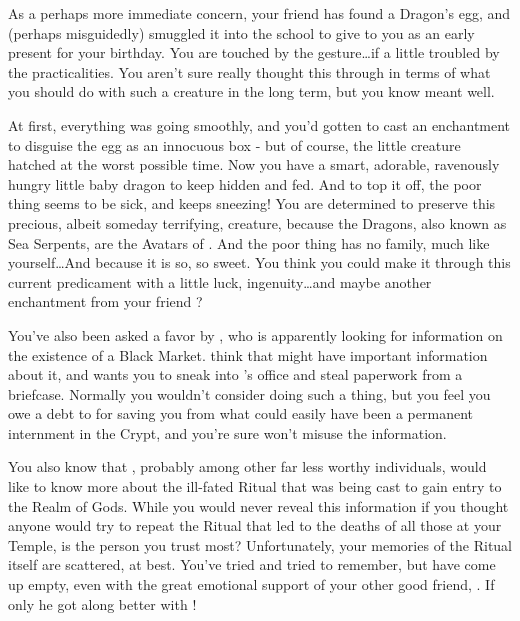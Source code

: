 \documentclass[char]{GL2020}
\begin{document}
As a perhaps more immediate concern, your friend \cPirateChild{} has found a Dragon’s egg, and (perhaps misguidedly) smuggled it into the school to give to you as an early present for your birthday. You are touched by the gesture\ldots if a little troubled by the practicalities. You aren’t sure \cPirateChild{} really thought this through in terms of what you should do with such a creature in the long term, but you know \cPirateChild{\they} meant well. 

At first, everything was going smoothly, and you’d gotten \cAdopted{} to cast an enchantment to disguise the egg as an innocuous box - but of course, the little creature hatched at the worst possible time. Now you have a smart, adorable, ravenously hungry little baby dragon to keep hidden and fed. And to top it off, the poor thing seems to be sick, and keeps sneezing! You are determined to preserve this precious, albeit someday terrifying, creature, because the Dragons, also known as Sea Serpents, are the Avatars of \cShipGod{}. And the poor thing has no family, much like yourself\ldots And because it is so, so sweet. You think you could make it through this current predicament with a little luck, ingenuity\ldots and maybe another enchantment from your friend \cAdopted{}?

You’ve also been asked a favor by \cWildCard{}, who is apparently looking for information on the existence of a Black Market. \cWildCard{\they} think\cWildCard{\plural} that \cBunker{} might have important information about it, and \cWildCard{\they} wants you to sneak into \cBunker{}’s office and steal paperwork from a briefcase. Normally you wouldn’t consider doing such a thing, but you feel you owe a debt to \cWildCard{} for saving you from what could easily have been a permanent internment in the Crypt, and you’re sure \cWildCard{\they} won’t misuse the information.

You also know that \cWildCard{}, probably among other far less worthy individuals, would like to know more about the ill-fated Ritual that was being cast to gain entry to the Realm of Gods. While you would never reveal this information if you thought anyone would try to repeat the Ritual that led to the deaths of all those at your Temple, \cWildCard is the person you trust most? Unfortunately, your memories of the Ritual itself are scattered, at best. You’ve tried and tried to remember, but have come up empty, even with the great emotional support of your other good friend, \cTechStar{}. If only he got along better with \cWildCard{}!
\end{document}
